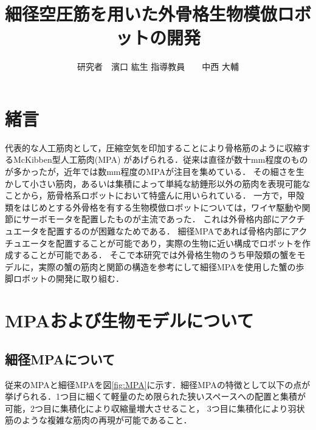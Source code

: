 \documentclass{jarticle}
\begin{document}

\title{
細径空圧筋を用いた外骨格生物模倣ロボットの開発
}
\author{
研究者　濱口 紘生   指導教員　　中西 大輔
}

\maketitle

\thispagestyle{empty}  %

\section{緒言}

代表的な人工筋肉として，圧縮空気を印加することにより骨格筋のように収縮するMcKibben型人工筋肉(MPA)
があげられる．従来は直径が数十mm程度のものが多かったが，近年では数mm程度のMPAが注目を集めている\cite{wakimoto}．
その細さを生かして小さい筋肉，あるいは集積によって単純な紡錘形以外の筋肉を表現可能なことから，筋骨格系ロボットにおいて特盛んに用いられている\cite{wakimoto}．
一方で，甲殻類をはじめとする外骨格を有する生物模倣ロボットについては，ワイヤ駆動や関節にサーボモータを配置したものが主流であった\cite{crabrobot}．
これは外骨格内部にアクチュエータを配置するのが困難なためである．
細径MPAであれば骨格内部にアクチュエータを配置することが可能であり，実際の生物に近い構成でロボットを作成することが可能である．
そこで本研究では外骨格生物のうち甲殻類の蟹をモデルに，実際の蟹の筋肉と関節の構造を参考にして細径MPAを使用した蟹の歩脚ロボットの開発に取り組む．

\vspace*{-2mm}
\section{MPAおよび生物モデルについて}

\vspace*{-1mm}
\subsection{細径MPAについて}

従来のMPAと細径MPAを図\ref{fig:MPA}に示す．細径MPAの特徴として以下の点が挙げられる．1つ目に細くて軽量のため限られた狭いスペースへの配置と集積が可能，2つ目に集積化により収縮量増大させること，
3つ目に集積化により羽状筋のような複雑な筋肉の再現が可能であること．
\end{document}

